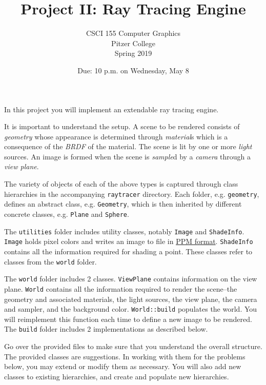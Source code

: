 \documentclass[addpoints]{exam}
\title{Project II: Ray Tracing Engine}
\author{CSCI 155 Computer Graphics\\Pitzer College\\Spring 2019}
\date{Due: 10 p.m. on Wednesday, May 8}
\begin{document}
\maketitle
\thispagestyle{empty}

In this project you will implement an extendable ray tracing engine.

It is important to understand the setup. A scene to be rendered consists of \emph{geometry} whose appearance is determined through \emph{material}s which is a consequence of the \emph{BRDF} of the material. The scene is lit by one or more \emph{light} sources. An image is formed when the scene is \emph{sample}d by a \emph{camera} through a \emph{view plane}.

The variety of objects of each of the above types is captured through class hierarchies in the accompanying \texttt{raytracer} directory. Each folder, e.g. \texttt{geometry}, defines an abstract class, e.g. \texttt{Geometry}, which is then inherited by different concrete classes, e.g. \texttt{Plane} and \texttt{Sphere}.

The \texttt{utilities} folder includes utility classes, notably \texttt{Image} and \texttt{ShadeInfo}. \texttt{Image} holds pixel colors and writes an image to file in \href{https://en.wikipedia.org/wiki/Netpbm_format#PBM_example}{PPM format}. \texttt{ShadeInfo} contains all the information required for shading a point. These classes refer to classes from the \texttt{world} folder.

The \texttt{world} folder includes 2 classes. \texttt{ViewPlane} contains information on the view plane. \texttt{World} contains all the information required to render the scene--the geometry and associated materials, the light sources, the view plane, the camera and sampler, and the background color. \texttt{World::build} populates the world. You will reimplement this function each time to define a new image to be rendered. The \texttt{build} folder includes 2 implementations as described below.

Go over the provided files to make sure that you understand the overall structure. The provided classes are suggestions. In working with them for the problems below, you may extend or modify them as necessary. You will also add new classes to existing hierarchies, and create and populate new hierarchies.
\end{document}
